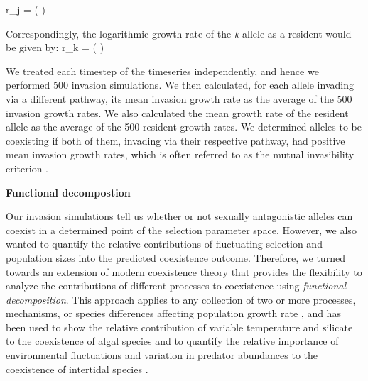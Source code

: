 \documentclass[12pt]{article}
\let\oldequation\equation
\let\oldendequation\endequation
\renewenvironment{equation}
  {\linenomathNonumbers\oldequation}
  {\oldendequation\endlinenomath}
\begin{document}
\begin{equation}
r_{j} =	\ln \left (  \right )
\label{invader}
\end{equation}

Correspondingly, the logarithmic growth rate of the \textit{k} allele as a resident would be given by:
\begin{equation}
r_{k} =	\ln \left (  \right )
\label{resident}
\end{equation}

We treated each timestep of the timeseries independently, and hence we performed 500 invasion simulations. We then calculated, for each allele invading via a different pathway, its mean invasion growth rate as the average of the 500 invasion growth rates. We also calculated the mean growth rate of the resident allele as the average of the 500 resident growth rates. We determined alleles to be coexisting if both of them, invading via their respective pathway, had positive mean invasion growth rates, which is often referred to as the mutual invasibility criterion \citep{barabas_chessons_2018}.

\vspace{5mm}
\noindent\textbf{Functional decompostion}

Our invasion simulations tell us whether or not sexually antagonistic alleles can coexist in a determined point of the selection parameter space. However, we also wanted to quantify the relative contributions of fluctuating selection and population sizes into the predicted coexistence outcome. Therefore, we turned towards an extension of modern coexistence theory \citep{ellner_expanded_2019} that provides the flexibility to analyze the contributions of different processes to coexistence using \textit{functional decomposition}. This approach applies to any collection of two or more processes, mechanisms, or species differences affecting population growth rate \citep{ ellner2016quantify, ellner_expanded_2019}, and has been used to show the relative contribution of variable temperature and silicate to the coexistence of algal species \citep{ellner2016quantify} and to quantify the relative importance of environmental fluctuations and variation in predator abundances to the coexistence of intertidal species \citep{shoemaker2020}.


\end{document}
